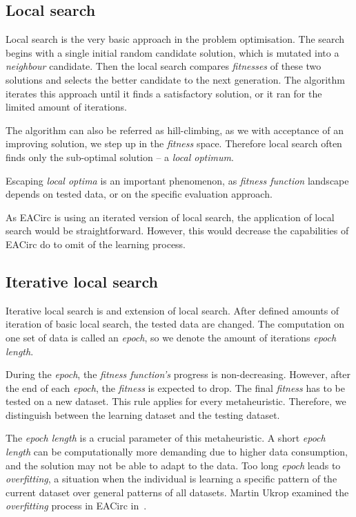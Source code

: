 \documentclass[
    digital,    %
    oneside,    %
    color,
    11pt,
    nocover,
    notable,
    nolof,
    nolot,
]{fithesis3}
\begin{document}
\subsection{Local search}
\label{subsec:opt-single-sol-ls}

Local search is the very basic approach in the problem optimisation. The search begins with a single initial random candidate solution, which is mutated into a \textit{neighbour} candidate. Then the local search compares \textit{fitnesses} of these two solutions and selects the better candidate to the next generation. The algorithm iterates this approach until it finds a satisfactory solution, or it ran for the limited amount of iterations.

The algorithm can also be referred as hill-climbing, as we with acceptance of an improving solution, we step up in the \textit{fitness} space. Therefore local search often finds only the sub-optimal solution -- a \textit{local optimum}.

Escaping \textit{local optima} is an important phenomenon, as \textit{fitness function} landscape depends on tested data, or on the specific evaluation approach.

As EACirc is using an iterated version of local search, the application of local search would be straightforward. However, this would decrease the capabilities of EACirc do to omit of the learning process.

\subsection{Iterative local search}
\label{subsec:opt-single-sol-ils}

Iterative local search is and extension of local search. After defined amounts of iteration of basic local search, the tested data are changed. The computation on one set of data is called an \textit{epoch}, so we denote the amount of iterations \textit{epoch length}.

During the \textit{epoch}, the \textit{fitness function's} progress is non-decreasing. However, after the end of each \textit{epoch}, the \textit{fitness} is expected to drop. The final \textit{fitness} has to be tested on a new dataset. This rule applies for every metaheuristic. Therefore, we distinguish between the learning dataset and the testing dataset.

The \textit{epoch length} is a crucial parameter of this metaheuristic. A short \textit{epoch length} can be computationally more demanding due to higher data consumption, and the solution may not be able to adapt to the data. Too long \textit{epoch} leads to \textit{overfitting}, a situation when the individual is learning a specific pattern of the current dataset over general patterns of all datasets. Martin Ukrop examined the \textit{overfitting} process in EACirc in~\cite[Chapter~7]{ukropBcThesis}.
\end{document}
